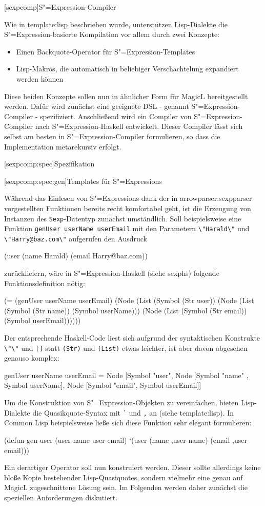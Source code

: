 \documentclass[11pt, a4paper, bibgerm]{scrbook}
\newcommand\icode[1]{\lstinline?#1?}
\newcommand\lchapter{}
\newcommand\lsection{}
\newcommand\lsubsection{}
\newcommand\cref{}
\newcommand\sref{}
\newcommand{\seec}[1]{(siehe \cref{#1})}
\newcommand{\sees}[1]{(siehe \sref{#1})}
\newcommand{\sexp}{S"=Expression}
\newcommand{\sexps}{S"=Expressions}
\begin{document}
\lchapter[sexpcomp]{\sexp{}-Compiler}

Wie in \sref{template:lisp} beschrieben wurde, unterstützen
Lisp-Dialekte die \sexp{}-basierte Kompilation vor allem durch zwei
Konzepte: 
\begin{itemize}
\item Einen Backquote-Operator für \sexp{}-Templates
\item Lisp-Makros, die automatisch in beliebiger Verschachtelung
  expandiert werden können
\end{itemize}
Diese beiden Konzepte sollen nun in ähnlicher Form für MagicL
bereitgestellt werden. Dafür wird zunächst eine geeignete DSL - genannt
\sexp{}-Compiler - spezifiziert. Anschließend wird ein Compiler von
\sexp{}-Compiler nach \sexp{}-Haskell entwickelt. Dieser Compiler lässt
sich selbst am besten in \sexp{}-Compiler formulieren, so dass die
Implementation metarekursiv erfolgt.

\lsection[sexpcomp:spec]{Spezifikation}

\lsubsection[sexpcomp:spec:gen]{Templates für \sexps}

Während das Einlesen von \sexps{} dank der in
\sref{arrowparser:sexpparser} vorgestellten Funktionen bereits recht
komfortabel geht, ist die Erzeugung von Instanzen des
\icode{Sexp}-Datentyp zunächst umständlich. Soll beispielsweise eine
Funktion \icode{genUser userName userEmail} mit den Parametern
\icode{\"Harald\"} und \icode{\"Harry@baz.com\"} aufgerufen den Ausdruck
\begin{code}
(user (name Harald) (email Harry@baz.com))
\end{code}
zurückliefern, wäre
in \sexp{}-Haskell \seec{sexphs} folgende Funktionsdefinition
nötig:
\begin{code}
(= (genUser userName userEmail)
   (Node (List (Symbol (Str user))
               (Node (List (Symbol (Str  name)) (Symbol userName)))
               (Node (List (Symbol (Str email)) (Symbol userEmail))))))
\end{code}
Der entsprechende Haskell-Code liest sich aufgrund der syntaktischen
Konstrukte \icode{\"\"} und \icode{[]} statt \icode{(Str)} und
\icode{(List)} etwas leichter, ist aber davon abgesehen genauso komplex:
\begin{code}
genUser userName userEmail =
   Node [Symbol "user",
         Node [Symbol "name" , Symbol userName],
         Node [Symbol "email", Symbol userEmail]]
\end{code}
Um die Konstruktion von \sexp{}-Objekten zu vereinfachen, bieten
Lisp-Dialekte die Quasikquote-Syntax mit \icode{`} und \icode{,} an
\sees{template:lisp}. In Common Lisp beispielsweise ließe sich diese
Funktion sehr elegant formulieren:
\begin{code}
(defun gen-user (user-name user-email)
  `(user (name ,user-name) (email ,user-email)))
\end{code}
Ein derartiger Operator soll nun konstruiert werden. Dieser sollte
allerdings keine bloße Kopie bestehender Lisp-Quasiquotes, sondern
vielmehr eine genau auf MagicL zugeschnittene Lösung sein. Im Folgenden
werden daher zunächst die speziellen Anforderungen diskutiert.
\end{document}
